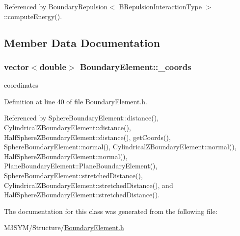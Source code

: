 Referenced by Boundary\+Repulsion$<$ B\+Repulsion\+Interaction\+Type $>$\+::compute\+Energy().



\subsection{Member Data Documentation}
\hypertarget{classBoundaryElement_ab51302e10e3e2def98438234ba5bf801}{
\subsubsection[{\+\_\+coords}]{\setlength{\rightskip}{0pt plus 5cm}vector$<$double$>$ Boundary\+Element\+::\+\_\+coords\hspace{0.3cm}{\ttfamily [protected]}}}\label{classBoundaryElement_ab51302e10e3e2def98438234ba5bf801}


coordinates 



Definition at line 40 of file Boundary\+Element.\+h.



Referenced by Sphere\+Boundary\+Element\+::distance(), Cylindrical\+Z\+Boundary\+Element\+::distance(), Half\+Sphere\+Z\+Boundary\+Element\+::distance(), get\+Coords(), Sphere\+Boundary\+Element\+::normal(), Cylindrical\+Z\+Boundary\+Element\+::normal(), Half\+Sphere\+Z\+Boundary\+Element\+::normal(), Plane\+Boundary\+Element\+::\+Plane\+Boundary\+Element(), Sphere\+Boundary\+Element\+::stretched\+Distance(), Cylindrical\+Z\+Boundary\+Element\+::stretched\+Distance(), and Half\+Sphere\+Z\+Boundary\+Element\+::stretched\+Distance().



The documentation for this class was generated from the following file\+:\begin{DoxyCompactItemize}
\item 
M3\+S\+Y\+M/\+Structure/\hyperlink{BoundaryElement_8h}{Boundary\+Element.\+h}\end{DoxyCompactItemize}
